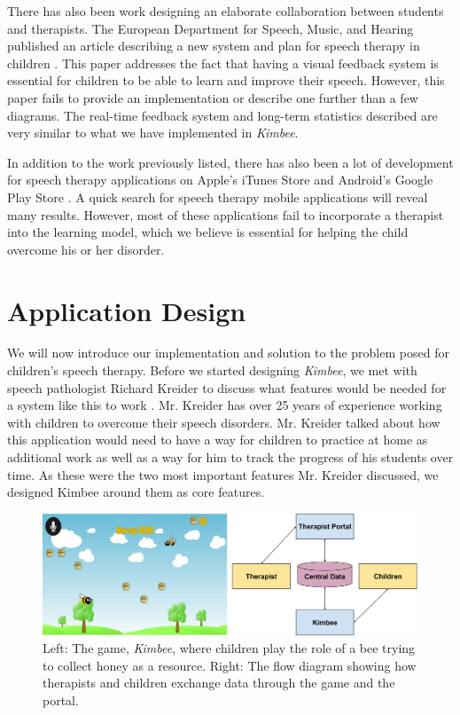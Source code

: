 \documentclass{sig-alternate-2013}
\begin{document}
There has also been work designing an elaborate collaboration between students and therapists. The European Department for Speech, Music, and Hearing published an article describing a new system and plan for speech therapy in children \cite{Oster:EU}. This paper addresses the fact that having a visual feedback system is essential for children to be able to learn and improve their speech. However, this paper fails to provide an implementation or describe one further than a few diagrams. The real-time feedback system and long-term statistics described are very similar to what we have implemented in {\em Kimbee}.

In addition to the work previously listed, there has also been a lot of development for speech therapy applications on Apple's iTunes Store and Android's Google Play Store \cite{Mobile:Apps}. A quick search for speech therapy mobile applications will reveal many results. However, most of these applications fail to incorporate a therapist into the learning model, which we believe is essential for helping the child overcome his or her disorder.

\section{Application Design}

We will now introduce our implementation and solution to the problem posed for children's speech therapy. Before we started designing {\em Kimbee}, we met with speech pathologist Richard Kreider to discuss what features would be needed for a system like this to work \cite{Kreider:Intro}. Mr. Kreider has over 25 years of experience working with children to overcome their speech disorders. Mr. Kreider talked about how this application would need to have a way for children to practice at home as additional work as well as a way for him to track the progress of his students over time. As these were the two most important features Mr. Kreider discussed, we designed Kimbee around them as core features.

\begin{figure}[t]
  \centering
  \includegraphics[keepaspectratio, width=\textwidth]{user_figure.png}
  \vspace{-22 pt}
  \caption{\normalfont Left: The game, {\em Kimbee}, where children play the role of a bee trying to collect honey as a resource. Right: The flow diagram showing how therapists and children exchange data through the game and the portal.}
  \label{fig:user}
\end{figure}
\end{document}
